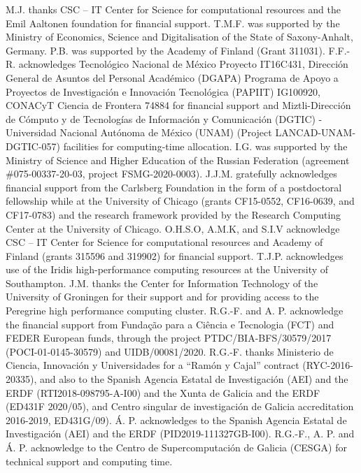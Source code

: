 \documentclass[journal=jpcbfk,manuscript=article]{achemso}
\begin{document}
\begin{acknowledgement}

M.J. thanks CSC -- IT Center for Science for computational resources and the Emil Aaltonen foundation for financial support.
T.M.F. was supported by the Ministry of Economics, Science
and Digitalisation of the State of Saxony-Anhalt, Germany.
P.B. was supported by the Academy of Finland (Grant 311031).
F.F.-R. acknowledges Tecnol\'{o}gico Nacional de M\'{e}xico Proyecto IT16C431, Direcci\'{o}n General de Asuntos del Personal Acad\'{e}mico (DGAPA) Programa de Apoyo a Proyectos de Investigaci\'{o}n e Innovaci\'{o}n Tecnol\'{o}gica (PAPIIT) IG100920, CONACyT Ciencia de Frontera 74884 for financial support and Miztli-Direcci\'{o}n de C\'{o}mputo y de Tecnolog\'{i}as de Informaci\'{o}n y Comunicaci\'{o}n (DGTIC) - Universidad Nacional Aut\'{o}noma de M{\'e}xico (UNAM) (Project LANCAD-UNAM-DGTIC-057) facilities for computing-time allocation.
I.G. was supported by the Ministry of Science and Higher Education of the Russian Federation (agreement \#075-00337-20-03, project FSMG-2020-0003). 
J.J.M. gratefully acknowledges financial support from the Carlsberg 
Foundation in the form of a postdoctoral fellowship while at 
the University of Chicago (grants CF15-0552, CF16-0639, and 
CF17-0783) and the research framework provided by the 
Research Computing Center at the University of Chicago.
O.H.S.O, A.M.K, and S.I.V acknowledge CSC -- IT Center for Science for computational resources and Academy of Finland (grants 315596 and 319902) for financial support.
T.J.P. acknowledges use of the Iridis high-performance computing resources at the University of Southampton.
J.M. thanks the Center for Information Technology of the University of Groningen for their support and for providing access to the Peregrine high performance computing cluster. R.G.-F. and A. P. acknowledge the financial support from Fundação para a Ciência e Tecnologia (FCT) and FEDER European funds, through the project PTDC/BIA-BFS/30579/2017 (POCI-01-0145-30579) and UIDB/00081/2020. R.G.-F. thanks Ministerio de Ciencia, Innovación y Universidades for a “Ramón y Cajal” contract (RYC-2016-20335), and also to the Spanish Agencia Estatal de Investigación (AEI) and the ERDF (RTI2018-098795-A-I00) and the Xunta de Galicia and the ERDF (ED431F 2020/05), and Centro singular de investigación de Galicia accreditation 2016-2019, ED431G/09). Á. P. acknowledges to the Spanish Agencia Estatal de Investigación (AEI) and the ERDF (PID2019-111327GB-I00). R.G.-F., A. P. and Á. P. acknowledge to the Centro de Supercomputación de Galicia (CESGA) for technical support and computing time.


\end{acknowledgement}



\end{document}
